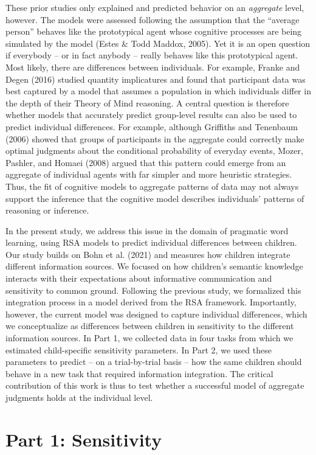 \documentclass[
  man,mask,floatsintext]{apa6}
\begin{document}
These prior studies only explained and predicted behavior on an \emph{aggregate} level, however. The models were assessed following the assumption that the ``average person'' behaves like the prototypical agent whose cognitive processes are being simulated by the model (Estes \& Todd Maddox, 2005). Yet it is an open question if everybody -- or in fact anybody -- really behaves like this prototypical agent. Most likely, there are differences between individuals. For example, Franke and Degen (2016) studied quantity implicatures and found that participant data was best captured by a model that assumes a population in which individuals differ in the depth of their Theory of Mind reasoning. A central question is therefore whether models that accurately predict group-level results can also be used to predict individual differences. For example, although Griffiths and Tenenbaum (2006) showed that groups of participants in the aggregate could correctly make optimal judgments about the conditional probability of everyday events, Mozer, Pashler, and Homaei (2008) argued that this pattern could emerge from an aggregate of individual agents with far simpler and more heuristic strategies. Thus, the fit of cognitive models to aggregate patterns of data may not always support the inference that the cognitive model describes individuals' patterns of reasoning or inference.

In the present study, we address this issue in the domain of pragmatic word learning, using RSA models to predict individual differences between children. Our study builds on Bohn et al. (2021) and measures how children integrate different information sources. We focused on how children's semantic knowledge interacts with their expectations about informative communication and sensitivity to common ground. Following the previous study, we formalized this integration process in a model derived from the RSA framework. Importantly, however, the current model was designed to capture individual differences, which we conceptualize as differences between children in sensitivity to the different information sources. In Part 1, we collected data in four tasks from which we estimated child-specific sensitivity parameters. In Part 2, we used these parameters to predict -- on a trial-by-trial basis -- how the same children should behave in a new task that required information integration. The critical contribution of this work is thus to test whether a successful model of aggregate judgments holds at the individual level.

\hypertarget{part-1-sensitivity}{%
\section{Part 1: Sensitivity}\label{part-1-sensitivity}}
\end{document}

